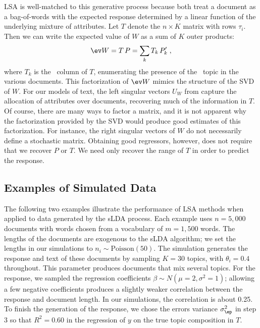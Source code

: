 \documentclass[12pt]{article}
\begin{document}
 
LSA is well-matched to this generative process because both treat a document as a bag-of-words with the expected response determined by a linear function of the underlying mixture of attributes.  Let $T$ denote the $n \times K$ matrix with rows $\tau_i$.  Then we can write the expected value of $W$ as a sum of $K$ outer products:
\begin{equation}
    \ev W = T\, P = \sum_k T_k \, P_k' \;,
  \label{eq:EW}
\end{equation}
where $T_k$ is the \ith[k]\ column of $T$, enumerating the presence of the \ith[k]\ topic in the various documents.  This factorization of $\ev W$ mimics the structure of the SVD of $W$.  For our models of text, the left singular vectors $U_W$ from  capture the allocation of attributes over documents, recovering much of the information in $T$.  Of course, there are many ways to factor a matrix, and it is not apparent why the factorization provided by the SVD would produce good estimates of this factorization.  For instance, the right singular vectors of $W$ do not necessarily define a stochastic matrix.  Obtaining good regressors, however, does not require that we recover $P$ or $T$.  We need only recover the range of $T$ in order to predict the response.  


\subsection{Examples of Simulated Data} %

The following two examples illustrate the performance of LSA methods when applied to data generated by the sLDA process.  Each example uses $n = 5,000$ documents with words chosen from a vocabulary of $m = 1,500$ words. The lengths of the documents are exogenous to the sLDA algorithm; we set  the lengths in our simulations to $n_i \sim \mbox{Poisson}(50)$.  The simulation generates the response and text of these documents by sampling $K = 30$ topics, with $\theta_i = 0.4$ throughout. This parameter produces documents that mix several topics.  For the response, we sampled the regression coefficients $\beta \sim N(\mu=2,\sigma^2=1)$; allowing a few negative coefficients produces a slightly weaker correlation between the response and document length. In our simulations, the correlation is about 0.25.  To finish the generation of the response, we chose the errors variance $\sigma_\ep^2$ in step 3 so that  $R^2 =0.60$ in the  regression of $y$ on the true topic composition in $T$.  
\end{document}

